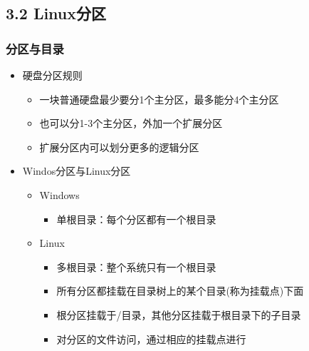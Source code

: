 \documentclass[xcolor=svgnames,bigger,presentation]{beamer}
\begin{document}
\subsection{3.2 Linux分区}
\label{sec-3-2}
\begin{frame}
\frametitle{分区与目录}
\label{sec-3-2-1}
\begin{itemize}

\item 硬盘分区规则
\label{sec-3-2-1-1}%
\begin{itemize}

\item 一块普通硬盘最少要分1个主分区，最多能分4个主分区
\label{sec-3-2-1-1-1}%

\item 也可以分1-3个主分区，外加一个扩展分区
\label{sec-3-2-1-1-2}%

\item 扩展分区内可以划分更多的逻辑分区
\label{sec-3-2-1-1-3}%
\end{itemize} %

\item Windos分区与Linux分区
\label{sec-3-2-1-2}%
\begin{itemize}

\item Windows
\label{sec-3-2-1-2-1}%
\begin{itemize}

\item 单根目录：每个分区都有一个根目录
\label{sec-3-2-1-2-1-1}%
\end{itemize} %

\item Linux
\label{sec-3-2-1-2-2}%
\begin{itemize}

\item 多根目录：整个系统只有一个根目录
\label{sec-3-2-1-2-2-1}%

\item 所有分区都挂载在目录树上的某个目录(称为挂载点)下面
\label{sec-3-2-1-2-2-2}%

\item 根分区挂载于/目录，其他分区挂载于根目录下的子目录
\label{sec-3-2-1-2-2-3}%

\item 对分区的文件访问，通过相应的挂载点进行
\label{sec-3-2-1-2-2-4}%
\end{itemize} %
\end{itemize} %
\end{itemize} %
\end{frame}
\end{document}
